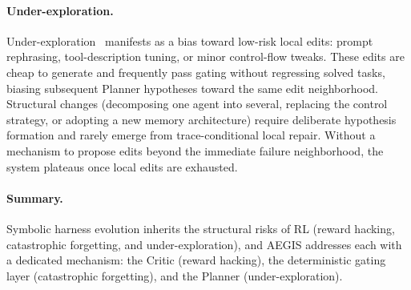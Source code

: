 \paragraph{Under-exploration.} Under-exploration~\cite{ladosz2022exploration} manifests as a bias toward low-risk local edits: prompt rephrasing, tool-description tuning, or minor control-flow tweaks. These edits are cheap to generate and frequently pass gating without regressing solved tasks, biasing subsequent Planner hypotheses toward the same edit neighborhood. Structural changes (decomposing one agent into several, replacing the control strategy, or adopting a new memory architecture) require deliberate hypothesis formation and rarely emerge from trace-conditional local repair. Without a mechanism to propose edits beyond the immediate failure neighborhood, the system plateaus once local edits are exhausted.

\paragraph{Summary.} Symbolic harness evolution inherits the structural risks of RL (reward hacking, catastrophic forgetting, and under-exploration), and AEGIS addresses each with a dedicated mechanism: the Critic (reward hacking), the deterministic gating layer (catastrophic forgetting), and the Planner (under-exploration).

